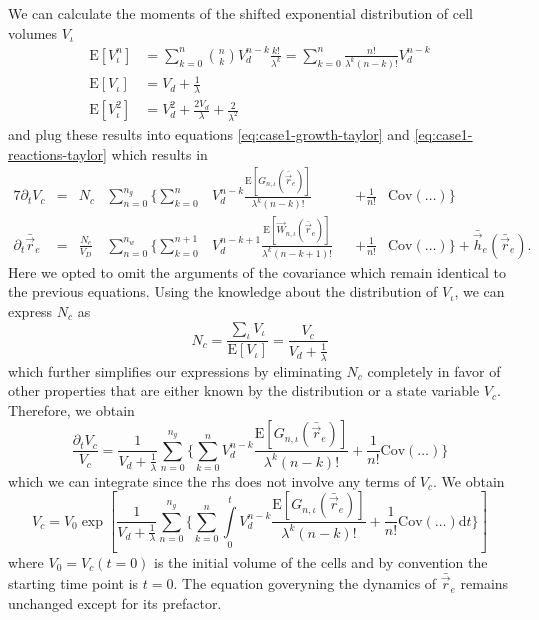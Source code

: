 We can calculate the moments of the shifted exponential distribution of cell volumes $V_\iota$
\begin{align}
    \text{E}[V_\iota^n] &= \sum\limits_{k=0}^n\binom{n}{k} V_d^{n-k}\frac{k!}{\lambda^k}
        = \sum\limits_{k=0}^n \frac{n!}{\lambda^k(n-k)!} V_d^{n-k}\\
    \text{E}[V_\iota] &= V_d + \frac{1}{\lambda}\\
    \text{E}[V_\iota^2] &= V_d^2 + \frac{2V_d}{\lambda} + \frac{2}{\lambda^2}
\end{align}
and plug these results into equations \eqref{eq:case1-growth-taylor} and
\eqref{eq:case1-reactions-taylor} which results in
\begin{alignat}{7}
    \partial_t V_c
    &= &N_c&\sum\limits_{n=0}^{n_g}\Bigg\{\sum\limits_{k=0}^n
        &V_d^{n-k}\frac{\text{E}[G_{n,\iota}(\bar{\vec{r}}_e)]}{\lambda^k(n-k)!}&
        &+ \frac{1}{n!}&\text{Cov}(\dots)\Bigg\}\\
    \partial_t\bar{\vec{r}}_e
    &= &\frac{N_c}{V_D}&\sum\limits_{n=0}^{n_w}\Bigg\{\sum\limits_{k=0}^{n+1}
        &V_d^{n-k+1}\frac{\text{E}[\vec{W}_{n,\iota}(\bar{\vec{r}}_e)]}{\lambda^k(n-k+1)!}&
        &+ \frac{1}{n!}&\text{Cov}(\dots)\Bigg\}
        + \bar{\vec{h}}_e(\bar{\vec{r}}_e).
\end{alignat}
Here we opted to omit the arguments of the covariance which remain identical to the previous
equations.
Using the knowledge about the distribution of $V_\iota$, we can express $N_c$ as
\begin{equation}
    N_c = \frac{\sum_\iota V_\iota}{\text{E}[V_\iota]} = \frac{V_c}{V_d+\frac{1}{\lambda}}
\end{equation}
which further simplifies our expressions by eliminating $N_c$ completely in favor of other
properties that are either known by the distribution or a state variable $V_c$.
Therefore, we obtain
\begin{equation}
    \frac{\partial_t V_c}{V_c}
    = \frac{1}{V_d+\frac{1}{\lambda}}\sum\limits_{n=0}^{n_g}\Bigg\{\sum\limits_{k=0}^n
            V_d^{n-k}\frac{\text{E}[G_{n,\iota}(\bar{\vec{r}}_e)]}{\lambda^k(n-k)!}
            + \frac{1}{n!}\text{Cov}(\dots)\Bigg\}
\end{equation}
which we can integrate since the \ac{rhs} does not involve any terms of $V_c$.
We obtain
\begin{equation}
    V_c = V_0\exp\left[
        \frac{1}{V_d+\frac{1}{\lambda}}\sum\limits_{n=0}^{n_g}\Bigg\{\sum\limits_{k=0}^n
            \int\limits_0^t
                V_d^{n-k}\frac{\text{E}[G_{n,\iota}(\bar{\vec{r}}_e)]}{\lambda^k(n-k)!}
                + \frac{1}{n!}\text{Cov}(\dots)
            \text{d}t\Bigg\}
        \right]
\end{equation}
where $V_0=V_c(t=0)$ is the initial volume of the cells and by convention the starting time point is
$t=0$.
The equation goveryning the dynamics of $\bar{\vec{r}}_e$ remains unchanged except for its
prefactor.

